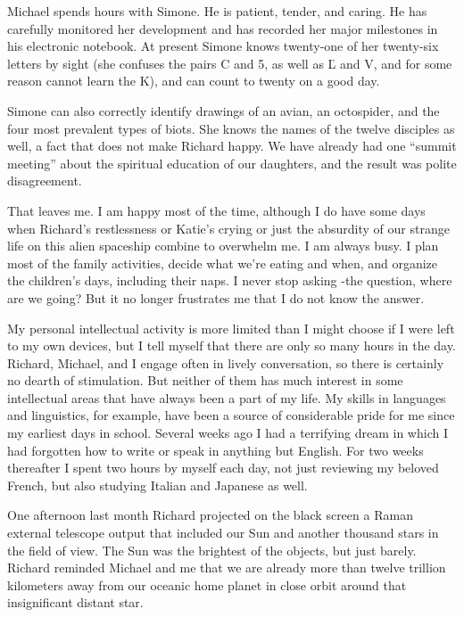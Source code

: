 \documentclass[]{article}
\begin{document}
Michael spends hours with Simone.  He is patient, tender, and caring.  He has carefully monitored her development and has recorded her major milestones in his electronic notebook.  At present Simone knows twenty-one of her twenty-six letters by sight (she confuses the pairs C and 5, as well as Ľ and V, and for some reason cannot learn the K), and can count to twenty on a good day.

Simone can also correctly identify drawings of an avian, an octospider, and the four most prevalent types of biots.  She knows the names of the twelve disciples as well, a fact that does not make Richard happy.  We have already had one “summit meeting” about the spiritual education of our daughters, and the result was polite disagreement.

That leaves me.  I am happy most of the time, although I do have some days when Richard’s restlessness or Katie’s crying or just the absurdity of our strange life on this alien spaceship combine to overwhelm me.  I am always busy.  I plan most of the family activities, decide what we’re eating and when, and organize the children’s days, including their naps.  I never stop asking -the question, where are we going? But it no longer frustrates me that I do not know the answer.

My personal intellectual activity is more limited than I might choose if I were left to my own devices, but I tell myself that there are only so many hours in the day.  Richard, Michael, and I engage often in lively conversation, so there is certainly no dearth of stimulation.  But neither of them has much interest in some intellectual areas that have always been a part of my life.  My skills in languages and linguistics, for example, have been a source of considerable pride for me since my earliest days in school.  Several weeks ago I had a terrifying dream in which I had forgotten how to write or speak in anything but English.  For two weeks thereafter I spent two hours by myself each day, not just reviewing my beloved French, but also studying Italian and Japanese as well.

One afternoon last month Richard projected on the black screen a Raman external telescope output that included our Sun and another thousand stars in the field of view.  The Sun was the brightest of the objects, but just barely.  Richard reminded Michael and me that we are already more than twelve trillion kilometers away from our oceanic home planet in close orbit around that insignificant distant star.
\end{document}

